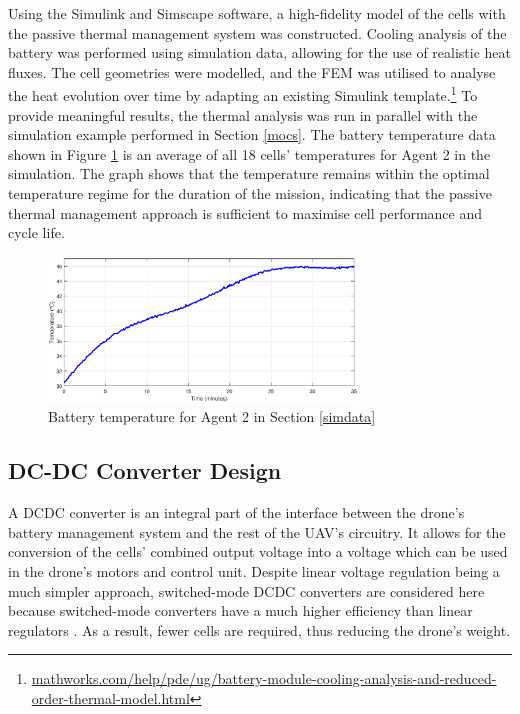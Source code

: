 Using the Simulink and Simscape software, a high-fidelity model of the cells with the passive thermal management system was constructed. Cooling analysis of the battery was performed using simulation data, allowing for the use of realistic heat fluxes. The cell geometries were modelled, and the \gls{FEM} was utilised to analyse the heat evolution over time by adapting an existing Simulink template.\footnote{\hyperlink{https://mathworks.com/help/pde/ug/battery-module-cooling-analysis-and-reduced-order-thermal-model.html}{mathworks.com/help/pde/ug/battery-module-cooling-analysis-and-reduced-order-thermal-model.html}} To provide meaningful results, the thermal analysis was run in parallel with the simulation example performed in Section \ref{mocs}. The battery temperature data shown in Figure \ref{fig:battemp} is an average of all 18 cells' temperatures for Agent 2 in the simulation. The graph shows that the temperature remains within the optimal temperature regime for the duration of the mission, indicating that the passive thermal management approach is sufficient to maximise cell performance and cycle life.

\begin{figure}[H]
\centering
\includegraphics[width=0.73\textwidth]{figs/Samuel/Figures/batttemp.eps}
\caption{Battery temperature for Agent 2 in Section \ref{simdata}}
\label{fig:battemp}
\end{figure}

\subsection{DC-DC Converter Design}

A \acrshort{DCDC} converter is an integral part of the interface between the drone's battery management system and the rest of the \acrshort{UAV}'s circuitry. It allows for the conversion of the cells' combined output voltage into a voltage which can be used in the drone's motors and control unit. Despite linear voltage regulation being a much simpler approach, switched-mode \acrshort{DCDC} converters are considered here because switched-mode converters have a much higher efficiency than linear regulators \cite{rogers2024powerelectronics}. As a result, fewer cells are required, thus reducing the drone's weight.

